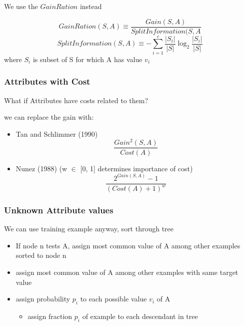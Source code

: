 We use the $GainRation$ instead

\begin{equation}
    GainRation(S,A) \equiv \frac{Gain(S,A)}{SplitInformation(S,A}
\end{equation}
\begin{equation}
    SplitInformation(S,A) \equiv - \sum_{i = 1}^{c}\frac{|S_{i}|}{|S|} \log_{2}\frac{|S_{i}|}{|S|}
\end{equation}
where $S_{i}$ is subset of S for which A has value $v_{i}$


\subsubsection{Attributes with Cost}

What if Attributes have costs related to them?

we can replace the gain with:
\begin{itemize}
    \item Tan and Schlimmer (1990)
    \begin{equation}
        \frac{Gain^{2}(S,A)}{Cost(A)}
    \end{equation}
    \item Nunez (1988) (w $\in$ [0, 1] determines importance of cost)
    \begin{equation}
        \frac{2^{Gain(S,A)} - 1}{(Cost(A) + 1)^{w}}
    \end{equation}
\end{itemize}

\subsubsection{Unknown Attribute values}

We can use training example anyway, sort through tree
\begin{itemize}
    \item If node n tests A, assign most common value of A among other examples sorted to node n
    \item assign most common value of A among other examples with same target value
    \item assign probability $p_{i}$ to each possible value $v_{i}$ of A
    \begin{itemize}
        \item assign fraction $p_{i}$ of example to each descendant in tree
    \end{itemize}
\end{itemize}

